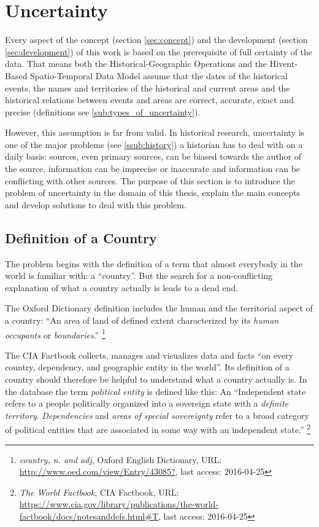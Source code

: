 
\section{Uncertainty} %
\label{sec:uncertainty}

Every aspect of the concept (section \ref{sec:concept}) and the development (section \ref{sec:development}) of this work is based on the prerequisite of full certainty of the data. That means both the Historical-Geographic Operations and the Hivent-Based Spatio-Temporal Data Model assume that the dates of the historical events, the names and territories of the historical and current areas and the historical relations between events and areas are correct, accurate, exact and precise (definitions see \ref{sub:types_of_uncertainty}).

However, this assumption is far from valid. In historical research, uncertainty is one of the major problems (see \ref{ssub:history}) a historian has to deal with on a daily basis: sources, even primary sources, can be biased towards the author of the source, information can be imprecise or inaccurate and information can be conflicting with other sources. The purpose of this section is to introduce the problem of uncertainty in the domain of this thesis, explain the main concepts and develop solutions to deal with this problem.


\subsection{Definition of a Country} %
\label{sub:definition_of_a_country}

The problem begins with the definition of a term that almost everybody in the world is familiar with: a ``country''. But the search for a non-conflicting explanation of what a country actually is leads to a dead end.

The Oxford Dictionary definition includes the human and the territorial aspect of a country: ``An area of land of defined extent characterized by its \emph{human occupants} or \emph{boundaries}.''
\footnote{\textit{country, n. and adj}, Oxford English Dictionary, URL: \url{http://www.oed.com/view/Entry/43085?}, last access: 2016-04-25}

The CIA Factbook collects, manages and visualizes data and facts ``on every country, dependency, and geographic entity in the world''. Its definition of a country should therefore be helpful to understand what a country actually is. In the database the term \emph{political entity} is defined like this: An ``Independent state refers to a people politically organized into a sovereign state with a \emph{definite territory}. \emph{Dependencies} and \emph{areas of special sovereignty} refer to a broad category of political entities that are associated in some way with an independent state.''
\footnote{\textit{The World Factbook}, CIA Factbook, URL: \url{https://www.cia.gov/library/publications/the-world-factbook/docs/notesanddefs.html\#T}, last access: 2016-04-25}

